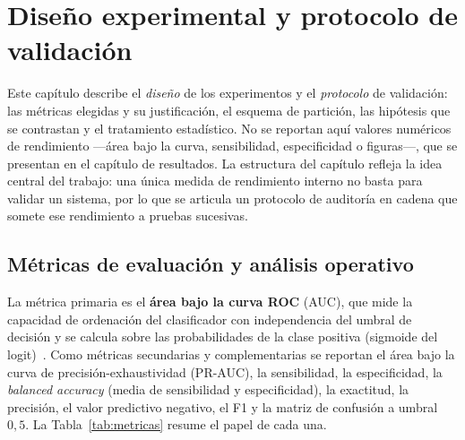 \chapter{Diseño experimental y protocolo de validación}
\renewcommand{\currentchapter}{Diseño experimental}

Este capítulo describe el \emph{diseño} de los experimentos y el \emph{protocolo}
de validación: las métricas elegidas y su justificación, el esquema de
partición, las hipótesis que se contrastan y el tratamiento estadístico. No se
reportan aquí valores numéricos de rendimiento ---área bajo la curva,
sensibilidad, especificidad o figuras---, que se presentan en el capítulo de
resultados. La estructura del capítulo refleja la idea central del trabajo: una
única medida de rendimiento interno no basta para validar un sistema, por lo que
se articula un protocolo de auditoría en cadena que somete ese rendimiento a
pruebas sucesivas.

\section{Métricas de evaluación y análisis operativo}

La métrica primaria es el \textbf{área bajo la curva ROC} (AUC), que mide la
capacidad de ordenación del clasificador con independencia del umbral de
decisión y se calcula sobre las probabilidades de la clase positiva (sigmoide
del logit)~\cite{hanley1982roc}. Como métricas secundarias y complementarias se reportan el área bajo
la curva de precisión-exhaustividad (PR-AUC), la sensibilidad, la especificidad,
la \emph{balanced accuracy} (media de sensibilidad y especificidad), la
exactitud, la precisión, el valor predictivo negativo, el F1 y la matriz de
confusión a umbral $0{,}5$. La Tabla~\ref{tab:metricas} resume el papel de cada
una.

